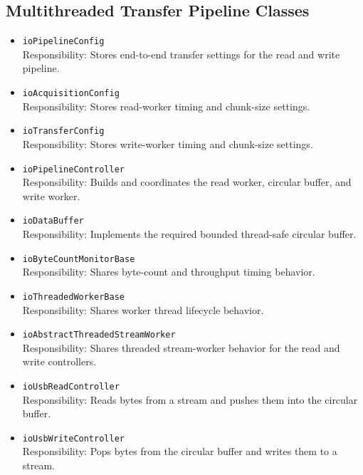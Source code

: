 \subsection{Multithreaded Transfer Pipeline Classes}
\begin{itemize}
    \item \texttt{ioPipelineConfig} \\
    Responsibility: Stores end-to-end transfer settings for the read and write pipeline.

    \item \texttt{ioAcquisitionConfig} \\
    Responsibility: Stores read-worker timing and chunk-size settings.

    \item \texttt{ioTransferConfig} \\
    Responsibility: Stores write-worker timing and chunk-size settings.

    \item \texttt{ioPipelineController} \\
    Responsibility: Builds and coordinates the read worker, circular buffer, and write worker.

    \item \texttt{ioDataBuffer} \\
    Responsibility: Implements the required bounded thread-safe circular buffer.

    \item \texttt{ioByteCountMonitorBase} \\
    Responsibility: Shares byte-count and throughput timing behavior.

    \item \texttt{ioThreadedWorkerBase} \\
    Responsibility: Shares worker thread lifecycle behavior.

    \item \texttt{ioAbstractThreadedStreamWorker} \\
    Responsibility: Shares threaded stream-worker behavior for the read and write controllers.

    \item \texttt{ioUsbReadController} \\
    Responsibility: Reads bytes from a stream and pushes them into the circular buffer.

    \item \texttt{ioUsbWriteController} \\
    Responsibility: Pops bytes from the circular buffer and writes them to a stream.


\end{itemize}
